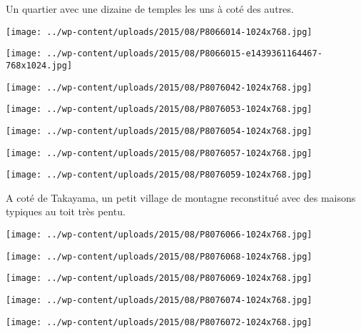  Un quartier avec une dizaine de temples les uns à coté des autres. \newline
 \newline
\centerline{\texttt{[image: ../wp-content/uploads/2015/08/P8066014-1024x768.jpg]} } 
 \newline
 \newline
\centerline{\texttt{[image: ../wp-content/uploads/2015/08/P8066015-e1439361164467-768x1024.jpg]} } 
 \newline
 \newline
\centerline{\texttt{[image: ../wp-content/uploads/2015/08/P8076042-1024x768.jpg]} } 
 \newline
 \newline
\centerline{\texttt{[image: ../wp-content/uploads/2015/08/P8076053-1024x768.jpg]} } 
 \newline
 \newline
\centerline{\texttt{[image: ../wp-content/uploads/2015/08/P8076054-1024x768.jpg]} } 
 \newline
 \newline
\centerline{\texttt{[image: ../wp-content/uploads/2015/08/P8076057-1024x768.jpg]} } 
 \newline
 \newline
\centerline{\texttt{[image: ../wp-content/uploads/2015/08/P8076059-1024x768.jpg]} } 
 \newline
 A coté de Takayama, un petit village de montagne reconstitué avec des maisons typiques au toit très pentu. \newline
 \newline
\centerline{\texttt{[image: ../wp-content/uploads/2015/08/P8076066-1024x768.jpg]} } 
 \newline
 \newline
\centerline{\texttt{[image: ../wp-content/uploads/2015/08/P8076068-1024x768.jpg]} } 
 \newline
 \newline
\centerline{\texttt{[image: ../wp-content/uploads/2015/08/P8076069-1024x768.jpg]} } 
 \newline
 \newline
\centerline{\texttt{[image: ../wp-content/uploads/2015/08/P8076074-1024x768.jpg]} } 
 \newline
 \newline
\centerline{\texttt{[image: ../wp-content/uploads/2015/08/P8076072-1024x768.jpg]} } 
